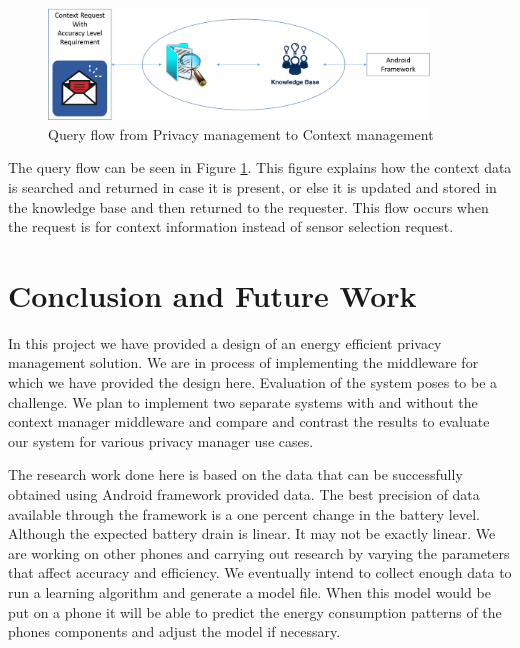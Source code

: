 \documentclass{ubicomp2013}
\begin{document}

\begin{figure}[tbh]
\centering
\includegraphics[width=0.9\textwidth]{flow.png}
\caption{Query flow from Privacy management to Context management}
\label{fig:flow}
\end{figure}

The query flow can be seen in Figure \ref{fig:flow}. This figure explains how the context data is searched and returned in case it is present, or else it is updated and stored in the knowledge base and then returned to the requester. This flow occurs when the request is for context information instead of sensor selection request.

\section{Conclusion and Future Work}

In this project we have provided a design of an energy efficient privacy management solution. We are in process of implementing the middleware for which we have provided the design here. Evaluation of the system poses to be a challenge. We plan to implement two separate systems with and without the context manager middleware and compare and contrast the results to evaluate our system for various privacy manager use cases.

The research work done here is based on the data that can be successfully obtained using Android framework provided data. The best precision of data available through the framework is a one percent change in the battery level. Although the expected battery drain is linear. It may not be exactly linear. We are working on other phones and carrying out research by varying the parameters that affect accuracy and efficiency. We eventually intend to collect enough data to run a learning algorithm and generate a model file. When this model would be put on a phone it will be able to predict the energy consumption patterns of the phones components and adjust the model if necessary.
\end{document}
